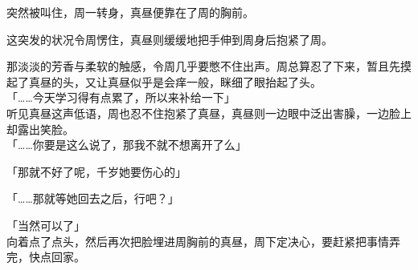 突然被叫住，周一转身，真昼便靠在了周的胸前。

这突发的状况令周愣住，真昼则缓缓地把手伸到周身后抱紧了周。

那淡淡的芳香与柔软的触感，令周几乎要憋不住出声。周总算忍了下来，暂且先摸起了真昼的头，又让真昼似乎是会痒一般，眯细了眼抬起了头。\\

「……今天学习得有点累了，所以来补给一下」\\

听见真昼这声低语，周也忍不住抱紧了真昼，真昼则一边眼中泛出害臊，一边脸上却露出笑脸。\\

「……你要是这么说了，那我不就不想离开了么」

「那就不好了呢，千岁她要伤心的」

「……那就等她回去之后，行吧？」

「当然可以了」\\

向着点了点头，然后再次把脸埋进周胸前的真昼，周下定决心，要赶紧把事情弄完，快点回家。
